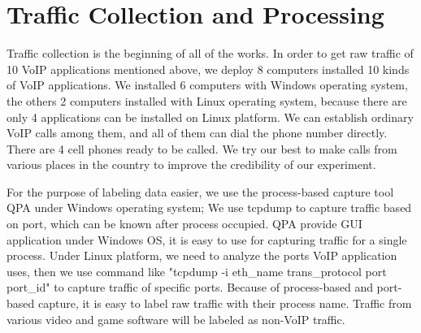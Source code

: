 \documentclass[conference]{IEEEtran}
\begin{document}

\section{Traffic Collection and Processing}
\label{sec:trafficcollectionandprocessing}
Traffic collection is the beginning of all of the works. In order to get raw traffic of 10 VoIP applications mentioned above, we deploy 8 computers installed 10 kinds of VoIP applications. We installed 6 computers with Windows operating system, the others 2 computers installed with Linux operating system, because there are only 4 applications can be installed on Linux platform. We can establish ordinary VoIP calls among them, and all of them can dial the phone number directly. There are 4 cell phones ready to be called. We try our best to make calls from various places in the country to improve the credibility of our experiment.



For the purpose of labeling data easier, we use the process-based capture tool QPA under Windows operating system; We use tcpdump to capture traffic based on port, which can be known after process occupied. QPA provide GUI application under Windows OS, it is easy to use for capturing traffic for a single process. Under Linux platform, we need to analyze the ports VoIP
application uses, then we use command like "tcpdump -i eth\_name trans\_protocol port port\_id" to capture traffic of specific ports. Because of process-based and port-based capture, it is easy to label raw traffic with their process name. Traffic from various video and game software will be labeled as non-VoIP traffic.
\end{document}
